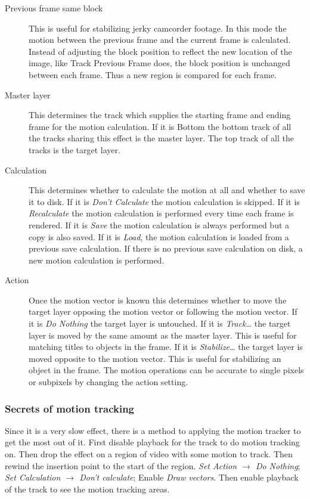 \begin{description}
    \item[Previous frame same block] This is useful for stabilizing jerky camcorder footage. In this mode the motion between the previous frame and the current frame is calculated. Instead of adjusting the block position to reflect the new location of the image, like Track Previous Frame does, the block position is unchanged between each frame. Thus a new region is compared for each frame.
    \item[Master layer] This determines the track which supplies the starting frame and ending frame for the motion calculation. If it is Bottom the bottom track of all the tracks sharing this effect is the master layer. The top track of all the tracks is the target layer.
    \item[Calculation] This determines whether to calculate the motion at all and whether to save it to disk. If it is \textit{Don't Calculate} the motion calculation is skipped. If it is \textit{Recalculate} the motion calculation is performed every time each frame is rendered. If it is \textit{Save} the motion calculation is always performed but a copy is also saved. If it is \textit{Load}, the motion calculation is loaded from a previous save calculation. If there is no previous save calculation on disk, a new motion calculation is performed.
    \item[Action] Once the motion vector is known this determines whether to move the target layer opposing the motion vector or following the motion vector. If it is \textit{Do Nothing} the target layer is untouched. If it is \textit{Track\dots} the target layer is moved by the same amount as the master layer. This is useful for matching titles to objects in the frame. If it is \textit{Stabilize\dots} the target layer is moved opposite to the motion vector. This is useful for stabilizing an object in the frame. The motion operations can be accurate to single pixels or subpixels by changing the action setting.
\end{description}

\subsubsection*{Secrets of motion tracking}
\label{ssub:secrets_motion_tracking}

Since it is a very slow effect, there is a method to applying the motion tracker to get the most out of it. First disable playback for the track to do motion tracking on. Then drop the effect on a region of video with some motion to track. Then rewind the insertion point to the start of the region. \textit{Set Action $\rightarrow$ Do Nothing}; \textit{Set Calculation $\rightarrow$ Don't calculate}; Enable \textit{Draw vectors}. Then enable playback of the track to see the motion tracking areas.


